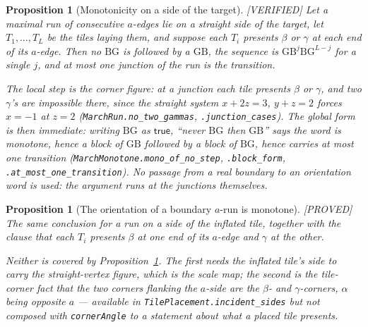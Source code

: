 \documentclass[11pt,reqno]{amsart}
\theoremstyle{plain}
\newtheorem{proposition}[theorem]{Proposition}
\theoremstyle{definition}
\newcommand{\lab}[1]{\hfill\textnormal{\footnotesize\textsc{[#1]}}}
\begin{document}
\begin{proposition}[Monotonicity on a side of the target]\label{prop:orientmonobdy}\lab{VERIFIED}
Let a maximal run of consecutive $a$-edges lie on a straight side of the target, let
$T_1,\dots,T_L$ be the tiles laying them, and suppose each $T_i$ presents $\beta$ or $\gamma$ at
each end of its $a$-edge. Then no $\mathrm{BG}$ is followed by a $\mathrm{GB}$, the sequence is
$\mathrm{GB}^{j}\mathrm{BG}^{L-j}$ for a single $j$, and at most one junction of the run is the
transition.

The local step is the corner figure: at a junction each tile presents $\beta$ or $\gamma$, and two
$\gamma$'s are impossible there, since the straight system $x+2z=3$, $y+z=2$ forces $x=-1$ at $z=2$
(\texttt{MarchRun.no\_two\_gammas}, \texttt{.junction\_cases}). The global form is then immediate:
writing $\mathrm{BG}$ as $\mathsf{true}$, ``never $\mathrm{BG}$ then $\mathrm{GB}$'' says the word
is monotone, hence a block of $\mathrm{GB}$ followed by a block of $\mathrm{BG}$, hence carries at
most one transition (\texttt{MarchMonotone.mono\_of\_no\_step}, \texttt{.block\_form},
\texttt{.at\_most\_one\_transition}). No passage from a real boundary to an orientation word is
used: the argument runs at the junctions themselves.
\end{proposition}

\begin{proposition}[The orientation of a boundary $a$-run is monotone]\label{prop:orientmono}\lab{PROVED}
The same conclusion for a run on a side of the \emph{inflated tile}, together with the clause that
each $T_i$ presents $\beta$ at one end of its $a$-edge and $\gamma$ at the other.

Neither is covered by Proposition~\ref{prop:orientmonobdy}. The first needs the inflated tile's side
to carry the straight-vertex figure, which is the scale map; the second is the tile-corner fact that
the two corners flanking the $a$-side are the $\beta$- and $\gamma$-corners, $\alpha$ being opposite
$a$ --- available in \texttt{TilePlacement.incident\_sides} but not composed with
\texttt{cornerAngle} to a statement about what a placed tile presents.
\end{proposition}
\end{document}
